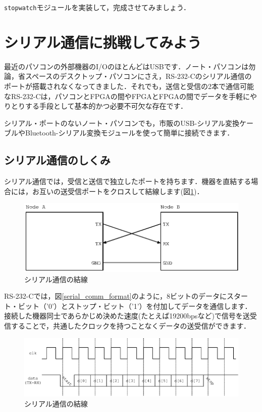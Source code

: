 \documentclass[a4paper,dvipdfmx]{jsarticle}
\begin{document}
\verb|stopwatch|モジュールを実装して，完成させてみましょう．

\section{シリアル通信に挑戦してみよう}

最近のパソコンの外部機器のI/OのほとんどはUSBです．ノート・パソコンは勿論，省スペースのデスクトップ・パソコンにさえ，RS-232-Cのシリアル通信のポートが搭載されなくなってきました．それでも，送信と受信の2本で通信可能なRS-232-Cは，パソコンとFPGAの間やFPGAとFPGAの間でデータを手軽にやりとりする手段として基本的かつ必要不可欠な存在です．

シリアル・ポートのないノート・パソコンでも，市販のUSB-シリアル変換ケーブルやBluetooth-シリアル変換モジュールを使って簡単に接続できます．

\subsection{シリアル通信のしくみ}
シリアル通信では，受信と送信で独立したポートを持ちます．機器を直結する場合には，お互いの送受信ポートをクロスして結線します(図\ref{fig:serial_comm})．

 \begin{figure}[H]
  \begin{center}
   \includegraphics[width=.6\textwidth]{chapter06_figures/serial_comm.eps}
  \end{center}  
  \caption{シリアル通信の結線\label{fig:serial_comm}}
 \end{figure}

RS-232-Cでは，図\ref{serial_comm_format}のように，8ビットのデータにスタート・ビット（'0'）とストップ・ビット（'1'）を付加してデータを通信します．接続した機器同士であらかじめ決めた速度(たとえば19200bpsなど)で信号を送受信することで，共通したクロックを持つことなくデータの送受信ができます．

 \begin{figure}[H]
  \begin{center}
   \includegraphics[width=.6\textwidth]{chapter06_figures/serial_comm_format.eps}
  \end{center}  
  \caption{シリアル通信の結線\label{fig:serial_comm_format}}
 \end{figure}
\end{document}
